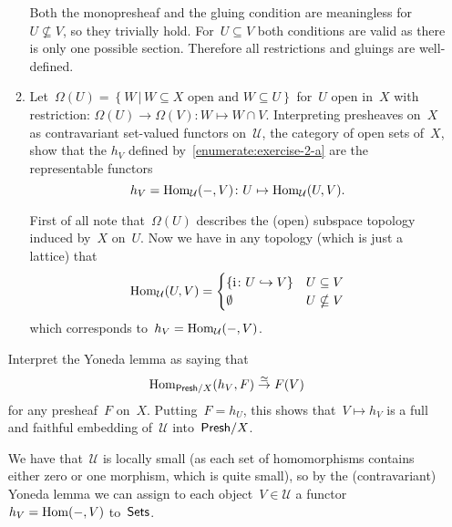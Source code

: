 \documentclass[a4paper,11pt,oneside,openany,article]{memoir}
\begin{document}
\begin{enumerate}
\begin{enumerate}
        \begin{solution}
          Both the monopresheaf and the gluing condition are meaningless for~$U\nsubseteq V$, so they trivially hold. For~$U\subseteq V$ both conditions are valid as there is only one possible section. Therefore all restrictions and gluings are well-defined.
        \end{solution}

      \item\label{enumerate:exercise-2-b} Let~$\Omega(U)=\left\{ W\,|\,\text{$W\subseteq X$ open and~$W\subseteq U$} \right\}$ for~$U$ open in~$X$ with restriction: $\Omega(U)\to\Omega(V):W\mapsto W\cap V$. Interpreting presheaves on~$X$ as contravariant set-valued functors on~$\mathcal{U}$, the category of open sets of~$X$, show that the $h_V$ defined by~\ref{enumerate:exercise-2-a} are the representable functors
        \begin{equation}
          h_V=\operatorname{Hom}_{\mathcal{U}}(-, V)\colon U\mapsto\operatorname{Hom}_{\mathcal{U}}(U,V).
        \end{equation}

        \begin{solution}
          First of all note that~$\Omega(U)$ describes the (open) subspace topology induced by~$X$ on~$U$. Now we have in any topology (which is just a lattice) that
          \begin{equation}
            \operatorname{Hom}_{\mathcal{U}}(U,V)=
            \begin{cases}
              \left\{ \mathrm{i}\colon U\hookrightarrow V \right\} & U\subseteq V \\
              \emptyset & U\nsubseteq V
            \end{cases}
          \end{equation}
          which corresponds to~$h_V=\operatorname{Hom}_{\mathcal{U}}(-,V)$.
        \end{solution}
    \end{enumerate}

    Interpret the Yoneda lemma as saying that
    \begin{equation}
      \operatorname{Hom}_{\mathsf{Presh}/X}(h_V,F)\overset{\simeq}{\to}F(V)
    \end{equation}
    for any presheaf~$F$ on~$X$. Putting~$F=h_U$, this shows that~$V\mapsto h_V$ is a full and faithful embedding of~$\mathcal{U}$ into~$\mathsf{Presh}/X$.

    \begin{solution}
      We have that~$\mathcal{U}$ is locally small (as each set of homomorphisms contains either zero or one morphism, which is quite small), so by the (contravariant) Yoneda lemma we can assign to each object~$V\in\mathcal{U}$ a functor~$h_V=\operatorname{Hom}(-,V)$ to~$\mathsf{Sets}$.
      

\end{solution}
\end{enumerate}
\end{document}
